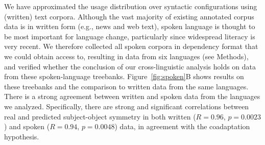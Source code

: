 \documentclass[11pt,a4paper]{article}
\newcommand\comment[1]{{\color{red}#1}}
\newcommand\mhahn[1]{{\color{red}(#1)}}
\begin{document}



We have approximated the usage distribution over syntactic configurations using (written) text corpora.
Although the vast majority of existing annotated corpus data is in written form (e.g., news and web text), spoken language is thought to be most important for language change, particularly since widespread literacy is very recent.
We therefore collected all spoken corpora in dependency format that we could obtain access to, resulting in data from six languages (see Methods), and verified whether the conclusion of our cross-linguistic analysis holds on data from these spoken-language treebanks. Figure~\ref{fig:spoken}B
shows results on these treebanks and the comparison to written data from the same languages.
There is a strong agreement between written and spoken data from the languages we analyzed. Specifically, there are strong and significant correlations between real and predicted subject-object symmetry in both written ($R=0.96$, $p=0.0023$) and spoken ($R=0.94$, $p=0.0048$) data, in agreement with the coadaptation hypothesis.



\end{document}
